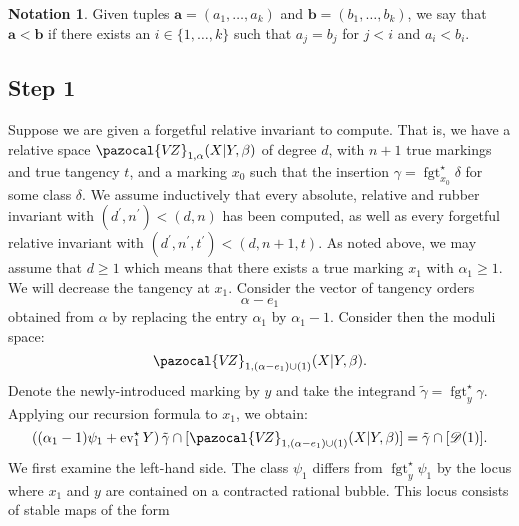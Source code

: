 \documentclass[11pt]{amsart}
\newcommand{\VZ}{\pazocal{V\!Z}}
\newcommand{\st}{\star}
\newcommand{\ev}{\operatorname{ev}}
\newcommand{\fgt}{\operatorname{fgt}}
\newcommand{\Dcal}{\mathcal{D}}
\theoremstyle{definition}
\newtheorem{notation}[thm]{Notation}
\theoremstyle{definition}
\begin{document}
\begin{notation}Given tuples $\mathbf{a}=(a_1,\ldots,a_k)$ and $\mathbf{b}=(b_1,\ldots,b_k)$, we say that $\mathbf{a}<\mathbf{b}$ if there exists an $i \in \{1,\ldots,k\}$ such that $a_j = b_j$ for $j < i$ and $a_i < b_i$.\end{notation}

\subsection*{Step 1} Suppose we are given a forgetful relative invariant to compute. That is, we have a relative space $\VZ_{1,\alpha}(X|Y,\beta)$ of degree $d$, with $n+1$ true markings and true tangency $t$, and a marking $x_0$ such that the insertion $\gamma=\fgt_{x_0}^\star \delta$ for some class $\delta$. We assume inductively that every absolute, relative and rubber invariant with $(d^\prime,n^\prime) < (d,n)$ has been computed, as well as every forgetful relative invariant with $(d^\prime,n^\prime,t^\prime) < (d,n+1,t)$. As noted above, we may assume that $d \geq 1$ which means that there exists a true marking $x_1$ with $\alpha_1 \geq 1$. We will decrease the tangency at $x_1$. Consider the vector of tangency orders
\begin{equation*} \alpha - e_1 \end{equation*}
obtained from $\alpha$ by replacing the entry $\alpha_1$ by $\alpha_1-1$. Consider then the moduli space:
\begin{equation*} \VZ_{1,(\alpha-e_1) \cup (1)}(X|Y,\beta). \end{equation*}
Denote the newly-introduced marking by $y$ and take the integrand $\tilde\gamma=\fgt_y^\st \gamma$. Applying our recursion formula to $x_1$, we obtain:
\begin{equation}\label{step 1 recursion}\left( (\alpha_1-1)\psi_1 + \ev_1^\st Y\right) \tilde\gamma \cap [\VZ_{1,(\alpha-e_1) \cup (1)}(X|Y,\beta)] = \tilde\gamma \cap [\Dcal(1)].\end{equation}
We first examine the left-hand side. The class $\psi_1$ differs from $\fgt_y^\st \psi_1$ by the locus where $x_1$ and $y$ are contained on a contracted rational bubble. This locus consists of stable maps of the form \medskip
\end{document}
